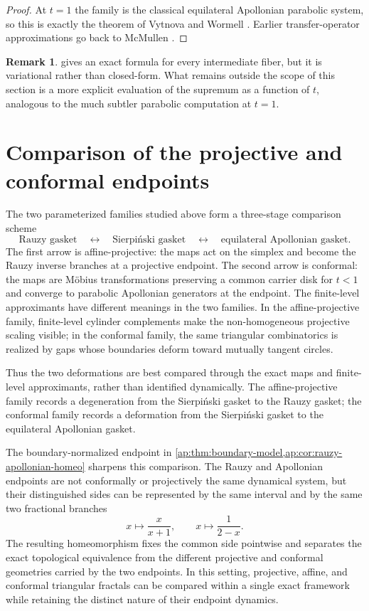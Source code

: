 \documentclass[11pt]{amsart}
\theoremstyle{definition}
\newtheorem{remark}[remark]{Remark}
\begin{document}
\begin{proof}
At $t=1$ the family is the classical equilateral Apollonian parabolic system, so this is exactly the theorem of Vytnova and Wormell \cite{VytnovaWormell2025}. Earlier transfer-operator approximations go back to McMullen \cite{McMullen1998}.
\end{proof}

\begin{remark}
 gives an exact formula for every intermediate fiber, but it is variational rather than closed-form. What remains outside the scope of this section is a more explicit evaluation of the supremum as a function of $t$, analogous to the much subtler parabolic computation at $t=1$.
\end{remark}

\section{Comparison of the projective and conformal endpoints}
The two parameterized families studied above form a three-stage comparison scheme
\[
\text{Rauzy gasket}\quad\longleftrightarrow\quad
\text{Sierpi\'nski gasket}\quad\longleftrightarrow\quad
\text{equilateral Apollonian gasket}.
\]
The first arrow is affine-projective: the maps act on the simplex and become the Rauzy inverse branches at a projective endpoint. The second arrow is conformal: the maps are M\"obius transformations preserving a common carrier disk for $t<1$ and converge to parabolic Apollonian generators at the endpoint. The finite-level approximants have different meanings in the two families. In the affine-projective family, finite-level cylinder complements make the non-homogeneous projective scaling visible; in the conformal family, the same triangular combinatorics is realized by gaps whose boundaries deform toward mutually tangent circles.

Thus the two deformations are best compared through the exact maps and finite-level approximants, rather than identified dynamically. The affine-projective family records a degeneration from the Sierpi\'nski gasket to the Rauzy gasket; the conformal family records a deformation from the Sierpi\'nski gasket to the equilateral Apollonian gasket.

The boundary-normalized endpoint in \cref{ap:thm:boundary-model,ap:cor:rauzy-apollonian-homeo} sharpens this comparison. The Rauzy and Apollonian endpoints are not conformally or projectively the same dynamical system, but their distinguished sides can be represented by the same interval and by the same two fractional branches
\[
  x\longmapsto \frac{x}{x+1},
  \qquad
  x\longmapsto \frac{1}{2-x}.
\]
The resulting homeomorphism fixes the common side pointwise and separates the exact topological equivalence from the different projective and conformal geometries carried by the two endpoints.  In this setting, projective, affine, and conformal triangular fractals can be compared within a single exact framework while retaining the distinct nature of their endpoint dynamics.
\end{document}
